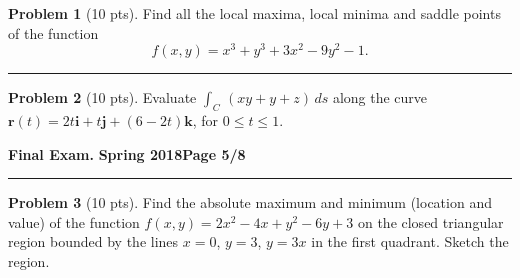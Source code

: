 \documentclass[12pt]{article}
\theoremstyle{definition}
\newtheorem{problem}{Problem}
\begin{document}
\bigskip
\begin{problem}[10 pts]
Find all the local maxima, local minima and saddle points of the function 
\begin{equation*}
f(x,y) = x^3+y^3+3x^2-9y^2-1.
\end{equation*}
  \vspace{13cm}
\end{problem}
\hrule
\begin{problem}[10 pts]
Evaluate $\int_C \, (xy+y+z)\, ds$ along the curve $\boldsymbol{r}(t) = 2t \boldsymbol{i} +t \boldsymbol{j} + (6-2t) \boldsymbol{k}$, for $0 \leq t \leq 1$.
\vspace{5cm}
\begin{flushright}
\end{flushright}
\end{problem}
\newpage

\hfill{\large\bf Final Exam.}\hfill{\large\bf
  Spring 2018}\hfill{\large\bf Page 5/8}\hrule

\bigskip
\begin{problem}[10 pts]
Find the absolute maximum and minimum (location and value) of the function $f(x,y) = 2x^2-4x+y^2-6y+3$ on the closed triangular region bounded by the lines $x=0$, $y=3$, $y=3x$ in the first quadrant.  Sketch the region.

\vspace{0.5cm}
\vspace{14cm}
\begin{flushright}
\end{flushright}
\end{problem}
\newpage
\end{document}
